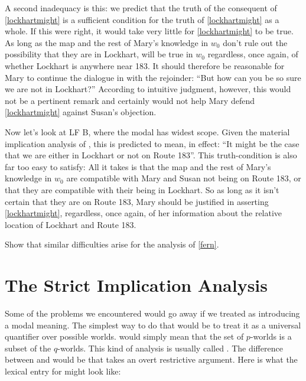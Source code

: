 A second inadequacy is this: we predict that the truth of the consequent of \ref{lockhartmight} is a sufficient condition for the truth of \ref{lockhartmight} as a whole. If this were right, it would take very little for \ref{lockhartmight} to be true. As long as the map and the rest of Mary's knowledge in $w_0$ don't rule out the possibility that they are in Lockhart,  will be true in $w_0$ \dash regardless, once again, of whether Lockhart is anywhere near 183. It should therefore be reasonable for Mary to continue the dialogue in \Last with the rejoinder: ``But how can you be so sure we are not in Lockhart?'' According to intuitive judgment, however, this would not be a pertinent remark and certainly would not help Mary defend \ref{lockhartmight} against Susan's objection.

Now let's look at LF B, where the modal has widest scope. Given the material implication analysis of , this is predicted to mean, in effect: ``It might be the case that we are either in Lockhart or not on Route 183''. This truth-condition is also far too easy to satisfy: All it takes is that the map and the rest of Mary's knowledge in $w_0$ are compatible with Mary and Susan not being on Route 183, or that they are compatible with their being in Lockhart. So as long as it isn't certain that they are on Route 183, Mary should be justified in asserting \ref{lockhartmight}, regardless, once again, of her information about the relative location of Lockhart and Route 183.

\begin{exercise}
	Show that similar difficulties arise for the analysis of \ref{fern}. \eex 
\end{exercise}

\section{The Strict Implication Analysis}

Some of the problems we encountered would go away if we treated  as introducing a modal meaning. The simplest way to do that would be to treat it as a universal quantifier over possible worlds.  would simply mean that the set of $p$-worlds is a subset of the $q$-worlds. This kind of analysis is usually called . The difference between  and  would be that  takes an overt restrictive argument. Here is what the lexical entry for  might look like:

